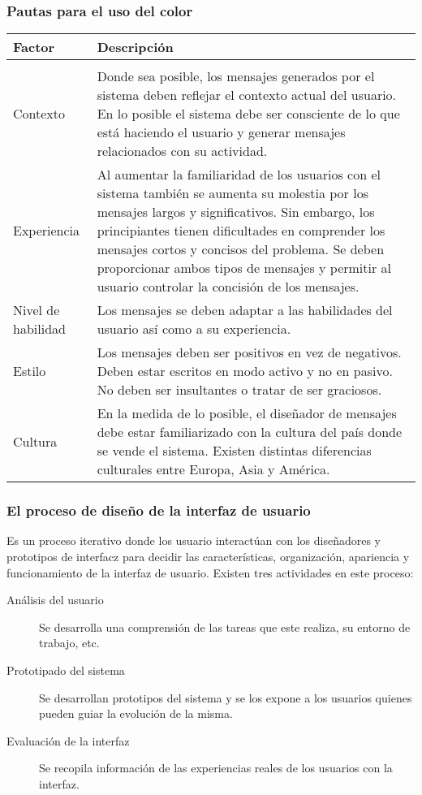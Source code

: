 \subsubsection{Pautas para el uso del color}
\begin{center}
\begin{tabu}{p{7cm}|p{7cm}}
\rowfont{\bfseries\itshape\large} Factor & Descripción\\
\hline
\\[2pt]

Contexto &
Donde sea posible, los mensajes generados por el sistema deben reflejar el contexto actual del usuario. En lo posible el sistema debe ser consciente de lo que está haciendo el usuario y generar mensajes relacionados con su actividad.\\[2pt]
Experiencia &
Al aumentar la familiaridad de los usuarios con el sistema también se aumenta su molestia por los mensajes largos y significativos. Sin embargo, los principiantes tienen dificultades en comprender los mensajes cortos y concisos del problema. Se deben proporcionar ambos tipos de mensajes y permitir al usuario controlar la concisión de los mensajes.\\[2pt]
Nivel de habilidad &
Los mensajes se deben adaptar a las habilidades del usuario así como a su experiencia. \\[2pt]
Estilo &
Los mensajes deben ser positivos en vez de negativos. Deben estar escritos en modo activo y no en pasivo. No deben ser insultantes o tratar de ser graciosos.\\[2pt]
Cultura &
En la medida de lo posible, el diseñador de mensajes debe estar familiarizado con la cultura del país donde se vende el sistema. Existen distintas diferencias culturales entre Europa, Asia y América.

\end{tabu}
\end{center}
\subsubsection{El proceso de diseño de la interfaz de usuario}
Es un proceso iterativo donde los usuario interactúan con los diseñadores y prototipos de interfacz para decidir las características, organización, apariencia y funcionamiento de la interfaz de usuario. Existen tres actividades en este proceso:
\begin{description}
\item[Análisis del usuario] Se desarrolla una comprensión de las tareas que este realiza, su entorno de trabajo, etc.
\item[Prototipado del sistema] Se desarrollan prototipos del sistema y se los expone a los usuarios quienes pueden guiar la evolución de la misma.
\item[Evaluación de la interfaz] Se recopila información de las experiencias reales de los usuarios con la interfaz.
\end{description}
